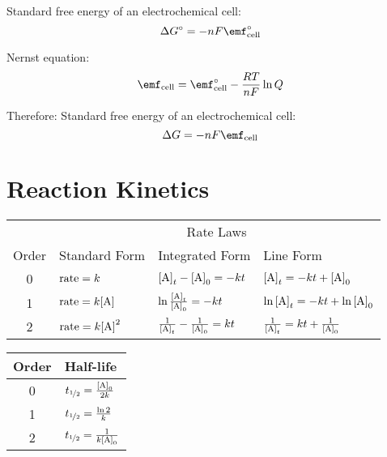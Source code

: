 \documentclass[10pt]{article}
\begin{document}
Standard free energy of an electrochemical cell:
\begin{equation*}
\Delta G\not = -nF\textnormal{\Enotcell}
\end{equation*}

Nernst equation:
\begin{equation*}
\textnormal{\Ecell} = \textnormal{\Enotcell} - \frac{RT}{nF}\ln Q
\end{equation*}

Therefore:
Standard free energy of an electrochemical cell:
\begin{equation*}
\Delta G = -nF\textnormal{\Ecell}
\end{equation*}

\section{Reaction Kinetics}

\begin{table}[H]
    \centering
        \begin{tabular}{clll}
            \toprule
                \multicolumn{1}{c}{} & \multicolumn{3}{c}{Rate Laws}\\
                \cmidrule(l){2-4} 
                Order & Standard Form & Integrated Form & Line Form \\
                \midrule
                0 & $\textnormal{rate}=k$ & $\textnormal{[A]}_t-\textnormal{[A]}_0=-kt$ & $\textnormal{[A]}_t=-kt+\textnormal{[A]}_0$   \\[10pt]
                1 & $\textnormal{rate}=k\textnormal{[A]}$ & $\ln\frac{\textnormal{[A]}_t}{\textnormal{[A]}_0}=-kt$ & $\ln\textnormal{[A]}_t=-kt+\ln\textnormal{[A]}_0$  \\[10pt]
                2 & $\textnormal{rate}=k\textnormal{[A]}^2$ & $\frac{1}{\textnormal{[A]}_t}-\frac{1}{\textnormal{[A]}_0}=kt$ & $\frac{1}{\textnormal{[A]}_t}=kt+\frac{1}{\textnormal{[A]}_0}$  \\
            \bottomrule
        \end{tabular}
    \label{tabrate}
\end{table}

\begin{table}[H]
    \centering
        \begin{tabular}{cl}
            \toprule
                Order & Half-life\\
                \midrule
                0 & $t_{\nicefrac{1}{2}}=\frac{\textnormal{[A]}_0}{2k}$ \\[10pt]
                1 & $t_{\nicefrac{1}{2}}=\frac{\ln 2}{k}$  \\[10pt]
                2 & $t_{\nicefrac{1}{2}}=\frac{1}{k\textnormal{[A]}_0}$  \\
            \bottomrule
        \end{tabular}
    \label{tabhalf}
\end{table}
\end{document}
